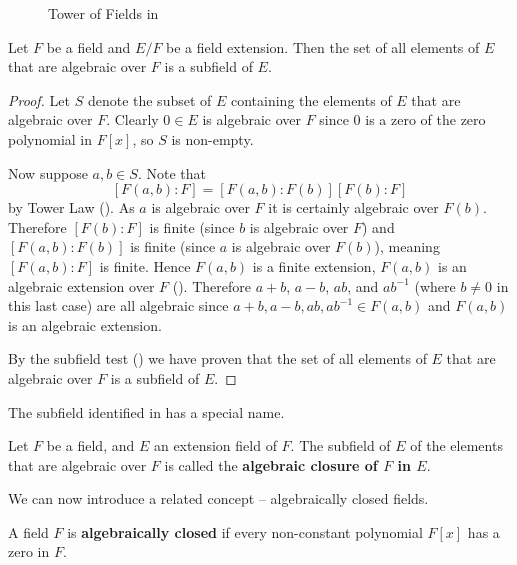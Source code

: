 \begin{figure}[H]
    \centering
    \caption{Tower of Fields in }
\end{figure}

\begin{corollary}\label{corollary-algebraic-closure-is-subfield}
    Let $F$ be a field and $E/F$ be a field extension. Then the set of all elements of $E$ that are algebraic over $F$ is a subfield of $E$.
\end{corollary}
\begin{proof}
    Let $S$ denote the subset of $E$ containing the elements of $E$ that are algebraic over $F$. Clearly $0 \in E$ is algebraic over $F$ since 0 is a zero of the zero polynomial in $F[x]$, so $S$ is non-empty.

    Now suppose $a,b \in S$. Note that
    \[
        [F(a,b):F] = [F(a,b):F(b)][F(b):F]
    \]
    by Tower Law (). As $a$ is algebraic over $F$ it is certainly algebraic over $F(b)$. Therefore $[F(b):F]$ is finite (since $b$ is algebraic over $F$) and $[F(a,b):F(b)]$ is finite (since $a$ is algebraic over $F(b)$), meaning $[F(a,b):F]$ is finite. Hence $F(a,b)$ is a finite extension, $F(a,b)$ is an algebraic extension over $F$ (). Therefore $a+b$, $a-b$, $ab$, and $ab^{-1}$ (where $b \neq 0$ in this last case) are all algebraic since $a+b,a-b,ab,ab^{-1} \in F(a,b)$ and $F(a,b)$ is an algebraic extension.

    By the subfield test () we have proven that the set of all elements of $E$ that are algebraic over $F$ is a subfield of $E$.
\end{proof}

The subfield identified in  has a special name.

\begin{definition}
    Let $F$ be a field, and $E$ an extension field of $F$. The subfield of $E$ of the elements that are algebraic over $F$ is called the \textbf{algebraic closure of $F$ in $E$}.
\end{definition}

We can now introduce a related concept -- algebraically closed fields.

\begin{definition}
    A field $F$ is \textbf{algebraically closed} if every non-constant polynomial $F[x]$ has a zero in $F$.
\end{definition}

